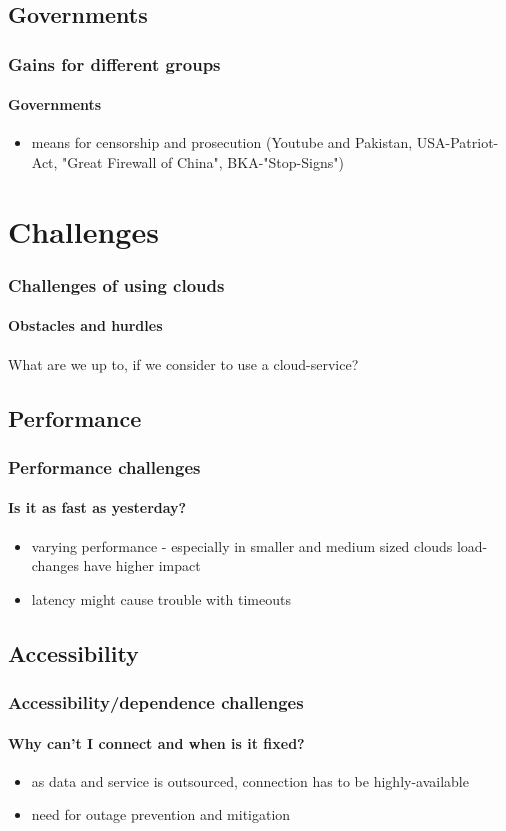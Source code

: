 \documentclass[]{beamer}
\begin{document}
\subsection{Governments}

\begin{frame}
        \frametitle{Gains for different groups}
        \framesubtitle{Governments}
        \begin{itemize}
                \item means for censorship and prosecution (Youtube and
                Pakistan, USA-Patriot-Act, "Great Firewall of China",
                BKA-"Stop-Signs")
        \end{itemize}
\end{frame}

\section{Challenges}

\begin{frame}
        \frametitle{Challenges of using clouds}
        \framesubtitle{Obstacles and hurdles}
        What are we up to, if we consider to use a cloud-service?
\end{frame}

\subsection{Performance}

\begin{frame}
        \frametitle{Performance challenges}
        \framesubtitle{Is it as fast as yesterday?}
        \begin{itemize}
                \item varying performance - especially in smaller and medium sized
                clouds {load-changes have higher impact}
                \item latency might cause trouble with timeouts
        \end{itemize}
\end{frame}

\subsection{Accessibility}

\begin{frame}
        \frametitle{Accessibility/dependence challenges}
        \framesubtitle{Why can't I connect and when is it fixed?}
        \begin{itemize}
                \item as data and service is outsourced, connection has to be
                highly-available
                \item need for outage prevention and mitigation
        \end{itemize}
\end{frame}
\end{document}
